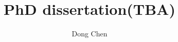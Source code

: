 \documentclass[balanced,twoside,11pt]{ubcdiss}
\title{PhD dissertation(TBA)}
\author{Dong Chen}
\begin{document}
		
		
		\maketitle
		
		\makecommitteepage
		
		
		\cleardoublepage
		
		
		\cleardoublepage
		
		
		\cleardoublepage
		
		\tableofcontents
		\cleardoublepage	%
		
		\listoftables
		\cleardoublepage	%
		
		\listoffigures
		\cleardoublepage	%
		
		
		
		\textspacing		%
		
		
		
		
		\mainmatter
		
		\acresetall	%
		
		
		
\end{document}
